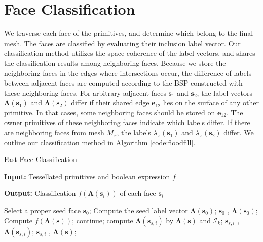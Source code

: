

\section{Face Classification}

\label{sec:classification}


We traverse each face of the primitives, and determine which belong to the final mesh. The faces are classified by evaluating their inclusion label vector. Our classification method utilizes the space coherence of the label vectors, and shares the classification results among neighboring faces. Because we store the neighboring faces in the edges where intersections occur, the difference of labels between adjacent faces are computed according to the BSP constructed with these neighboring faces. For arbitrary adjacent faces $\bm{s}_1$ and $\bm{s}_2$, the label vectors $\bm{\Lambda}(\bm{s}_1)$ and $\bm{\Lambda}(\bm{s}_2)$ differ if their shared edge $\bm{e}_{12}$ lies on the surface of any other primitive.
In that cases, some neighboring faces should be stored on $\bm{e}_{12}$. The owner primitives of these neighboring faces indicate which labels differ. If there are neighboring faces from mesh $M_x$, the labels $\lambda_x(\bm{s}_1)$ and $\lambda_x(\bm{s}_2)$ differ. We outline our classification method in Algorithm \ref{code:floodfill}.

\begin{algorithm}[ht]
\caption{Fast Face Classification}
\label{code:floodfill}
\textbf{Input: } Tessellated primitives and boolean expression $f$

\textbf{Output: } Classification $f(\bm{\Lambda}(\bm{s}_i))$ of each face $\bm{s}_i$


\begin{algorithmic}[1]
\State Select a proper seed face $\bm{s}_0$;
\State Compute the seed label vector $\boldsymbol{\Lambda}(\bm{s}_0)$;
\State {} { $\bm{s}_0$ , $\boldsymbol{\Lambda}(\bm{s}_0)$};
\State
{}
    \State Compute $f(\boldsymbol{\Lambda}(\bm{s}))$;
            \State continue;
        \EndIf
            \State compute $\boldsymbol{\Lambda}(\bm{s}_{s, i})$ by $\boldsymbol{\Lambda}(\bm{s})$ and ${\bm{\mathcal{I}}}_k$;
            \State {} { $\bm{s}_{s, i}$ , $\boldsymbol{\Lambda}(\bm{s}_{s, i})$};
        \Else
            \State {} { $\bm{s}_{s, i}$ , $\boldsymbol{\Lambda}(\bm{s})$};
        \EndIf
    \EndFor
\EndFunction
\end{algorithmic}
\end{algorithm}


